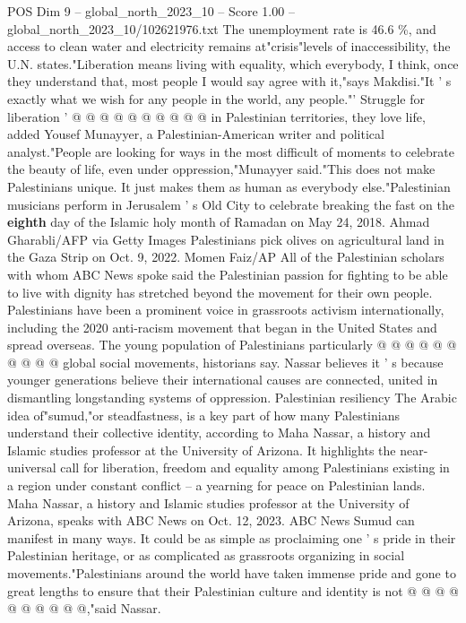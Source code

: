 \begin{textsample}{POS Dim 9 – global\_north\_2023\_10 – Score 1.00 – global\_north\_2023\_10/102621976.txt}
The unemployment rate is 46.6 \%, and access to clean water and electricity remains at"crisis"levels of inaccessibility, the U.N. states."Liberation means living with equality, which everybody, I think, once they understand that, most people I would say agree with it,"says Makdisi."It ' s exactly what we wish for any people in the world, any people."' Struggle for liberation ' @ @ @ @ @ @ @ @ @ @ in Palestinian territories, they love life, added Yousef Munayyer, a Palestinian-American writer and political analyst."People are looking for ways in the most difficult of moments to celebrate the beauty of life, even under oppression,"Munayyer said."This does not make Palestinians unique.
It just makes them as human as everybody else."Palestinian musicians perform in Jerusalem ' s Old City to celebrate breaking the fast on the \textbf{eighth} day of the Islamic holy month of Ramadan on May 24, 2018.
Ahmad Gharabli/AFP via Getty Images Palestinians pick olives on agricultural land in the Gaza Strip on Oct. 9, 2022.
Momen Faiz/AP All of the Palestinian scholars with whom ABC News spoke said the Palestinian passion for fighting to be able to live with dignity has stretched beyond the movement for their own people.
Palestinians have been a prominent voice in grassroots activism internationally, including the 2020 anti-racism movement that began in the United States and spread overseas.
The young population of Palestinians particularly @ @ @ @ @ @ @ @ @ @ global social movements, historians say.
Nassar believes it ' s because younger generations believe their international causes are connected, united in dismantling longstanding systems of oppression.
Palestinian resiliency The Arabic idea of"sumud,"or steadfastness, is a key part of how many Palestinians understand their collective identity, according to Maha Nassar, a history and Islamic studies professor at the University of Arizona.
It highlights the near-universal call for liberation, freedom and equality among Palestinians existing in a region under constant conflict -- a yearning for peace on Palestinian lands.
Maha Nassar, a history and Islamic studies professor at the University of Arizona, speaks with ABC News on Oct. 12, 2023.
ABC News Sumud can manifest in many ways.
It could be as simple as proclaiming one ' s pride in their Palestinian heritage, or as complicated as grassroots organizing in social movements."Palestinians around the world have taken immense pride and gone to great lengths to ensure that their Palestinian culture and identity is not @ @ @ @ @ @ @ @ @ @,"said Nassar.

\end{textsample}
